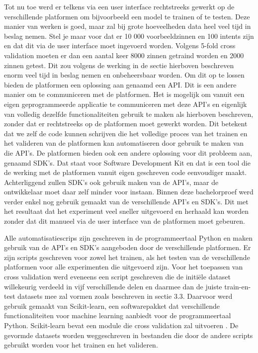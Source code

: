 Tot nu toe werd er telkens via een user interface rechtstreeks gewerkt op de verschillende platformen om bijvoorbeeld een model te trainen of te testen. Deze manier van werken is goed, maar zal bij grote hoeveelheden data heel veel tijd in beslag nemen. Stel je maar voor dat er 10 000 voorbeeldzinnen  en 100 intents zijn en dat dit via de user interface moet ingevoerd worden. Volgens 5-fold cross validation moeten er dan een aantal keer 8000 zinnen getraind worden en 2000 zinnen getest. Dit zou volgens de werking in de sectie hierboven beschreven enorm veel tijd in beslag nemen en onbeheersbaar worden. Om dit op te lossen bieden de platformen een oplossing aan genaamd een API. Dit is een andere manier om te communiceren met de platformen. Het is mogelijk om vanuit een eigen geprogrammeerde applicatie te communiceren met deze API’s en eigenlijk van volledig dezelfde functionaliteiten gebruik te maken als hierboven beschreven, zonder dat er rechtstreeks op de platformen moet gewerkt worden. Dit betekent dat we zelf de code kunnen schrijven die het volledige proces van het trainen en het valideren van de platformen kan automatiseren door gebruik te maken van die API’s. De platformen bieden ook een andere oplossing voor dit probleem aan, genaamd SDK's. Dat staat voor Software Development Kit en dat is een tool die de werking met de platformen vanuit eigen geschreven code eenvoudiger maakt. Achterliggend zullen SDK's ook gebruik maken van de API's, maar de ontwikkelaar moet daar zelf minder voor instaan. Binnen deze bachelorproef werd verder enkel nog gebruik gemaakt van de verschillende API’s en SDK's. Dit met het resultaat dat het experiment veel sneller uitgevoerd en herhaald kan worden zonder dat dit manueel via de user interface van de platformen moet gebeuren.

Alle automatisatiescrips zijn geschreven in de programmeertaal Python en maken gebruik van de API’s en SDK's aangeboden door de verschillende platformen. Er zijn scripts geschreven voor zowel het trainen, als het testen van de verschillende platformen voor alle experimenten die uitgevoerd zijn. Voor het toepassen van cross validation werd eveneens een script geschreven die de initiële dataset willekeurig verdeeld in vijf verschillende delen en daarmee dan de juiste train-en-test datasets mee zal vormen zoals beschreven in sectie 3.3. Daarvoor werd gebruik gemaakt van Scikit-learn, een softwarepakket dat verschillende functionaliteiten voor machine learning aanbiedt voor de programmeertaal Python. Scikit-learn bevat een module die cross validation zal uitvoeren \autocite{sklearn2020}. De gevormde datasets worden weggeschreven in bestanden die door de andere scripts gebruikt worden voor het trainen en het valideren.

